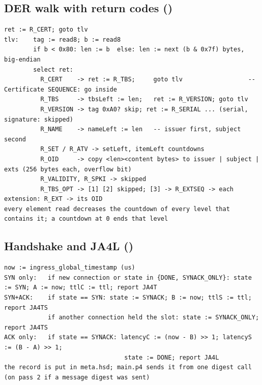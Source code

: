 \subsection{DER walk with return codes ()}
\begin{Verbatim}
ret := R_CERT; goto tlv
tlv:    tag := read8; b := read8
        if b < 0x80: len := b  else: len := next (b & 0x7f) bytes, big-endian
        select ret:
          R_CERT    -> ret := R_TBS;     goto tlv                  -- Certificate SEQUENCE: go inside
          R_TBS     -> tbsLeft := len;   ret := R_VERSION; goto tlv
          R_VERSION -> tag 0xA0? skip; ret := R_SERIAL ... (serial, signature: skipped)
          R_NAME    -> nameLeft := len   -- issuer first, subject second
          R_SET / R_ATV -> setLeft, itemLeft countdowns
          R_OID     -> copy <len><content bytes> to issuer | subject | exts (256 bytes each, overflow bit)
          R_VALIDITY, R_SPKI -> skipped
          R_TBS_OPT -> [1] [2] skipped; [3] -> R_EXTSEQ -> each extension: R_EXT -> its OID
every element read decreases the countdown of every level that contains it; a countdown at 0 ends that level
\end{Verbatim}

\subsection{Handshake and JA4L ()}
\begin{Verbatim}
now := ingress_global_timestamp (us)
SYN only:   if new connection or state in {DONE, SYNACK_ONLY}: state := SYN; A := now; ttlC := ttl; report JA4T
SYN+ACK:    if state == SYN: state := SYNACK; B := now; ttlS := ttl; report JA4TS
            if another connection held the slot: state := SYNACK_ONLY; report JA4TS
ACK only:   if state == SYNACK: latencyC := (now - B) >> 1; latencyS := (B - A) >> 1;
                                 state := DONE; report JA4L
the record is put in meta.hsd; main.p4 sends it from one digest call (on pass 2 if a message digest was sent)
\end{Verbatim}


